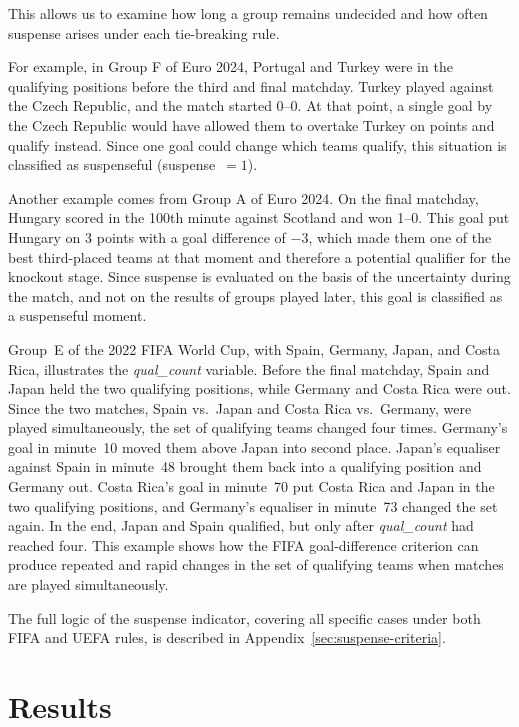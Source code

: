 \documentclass[11pt]{article}
\begin{document}
This allows us to examine how long a group remains undecided and how often suspense arises under each tie-breaking rule.

For example, in Group F of Euro 2024, Portugal and Turkey were in the qualifying positions before the third and final matchday. Turkey played against the Czech Republic, and the match started 0--0. At that point, a single goal by the Czech Republic would have allowed them to overtake Turkey on points and qualify instead. Since one goal could change which teams qualify, this situation is classified as suspenseful (suspense~$= 1$).

Another example comes from Group A of Euro 2024. On the final matchday, Hungary scored in the 100th minute against Scotland and won 1--0. This goal put Hungary on 3 points with a goal difference of $-3$, which made them one of the best third-placed teams at that moment and therefore a potential qualifier for the knockout stage. Since suspense is evaluated on the basis of the uncertainty during the match, and not on the results of groups played later, this goal is classified as a suspenseful moment.

Group~E of the 2022 FIFA World Cup, with Spain, Germany, Japan, and Costa Rica, illustrates the \textit{qual\_count} variable. Before the final matchday, Spain and Japan held the two qualifying positions, while Germany and Costa Rica were out. Since the two matches, Spain vs.\ Japan and Costa Rica vs.\ Germany, were played simultaneously, the set of qualifying teams changed four times. Germany's goal in minute~10 moved them above Japan into second place. Japan's equaliser against Spain in minute~48 brought them back into a qualifying position and Germany out. Costa Rica's goal in minute~70 put Costa Rica and Japan in the two qualifying positions, and Germany's equaliser in minute~73 changed the set again. In the end, Japan and Spain qualified, but only after \textit{qual\_count} had reached four. This example shows how the FIFA goal-difference criterion can produce repeated and rapid changes in the set of qualifying teams when matches are played simultaneously.

The full logic of the suspense indicator, covering all specific cases under both FIFA and UEFA rules, is described in Appendix~\ref{sec:suspense-criteria}.


\section{Results}
\label{sec:results}
\end{document}
